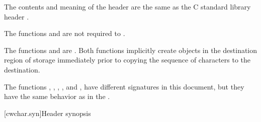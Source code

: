 \pnum
The contents and meaning of the header 
are the same as the C standard library header .

\pnum
The functions  and  are not required to
.

\pnum
{}%
%
The functions  and  are .
Both functions implicitly create objects
in the destination region of storage
immediately prior to copying the sequence of characters to the destination.

\pnum
\begin{note}
The functions
, , , , and ,
have different signatures in this document,
but they have the same behavior as in the .
\end{note}


[cwchar.syn]{Header  synopsis}

